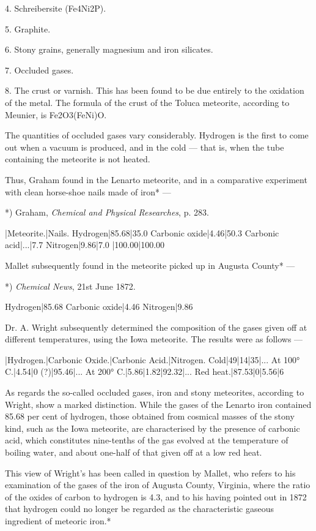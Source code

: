 \documentclass[a4paper, 12pt, oneside, polutonikogreek, english]{article}
\begin{document}
4. Schreibersite (Fe4Ni2P).

5. Graphite.

6. Stony grains, generally magnesium and iron silicates.

7. Occluded gases.

8. The crust or varnish. This has been found to be due entirely to the oxidation of the metal. The formula of the crust of the Toluca meteorite, according to Meunier, is Fe2O3(FeNi)O.

The quantities of occluded gases vary considerably. Hydrogen is the first to come out when a vacuum is produced, and in the cold --- that is, when the tube containing the meteorite is not heated.

Thus, Graham found in the Lenarto meteorite, and in a comparative experiment with clean horse-shoe nails made of iron* ---

*) Graham, \emph{Chemical and Physical Researches}, p. 283.

|Meteorite.|Nails. 
Hydrogen|85.68|35.0 
Carbonic oxide|4.46|50.3 
Carbonic acid|...|7.7 
Nitrogen|9.86|7.0 
|100.00|100.00

Mallet subsequently found in the meteorite picked up in Augusta County* ---

*) \emph{Chemical News}, 21st June 1872.

Hydrogen|85.68 
Carbonic oxide|4.46 
Nitrogen|9.86

Dr. A. Wright subsequently determined the composition of the gases given off at different temperatures, using the Iowa meteorite. The results were as follows ---

|Hydrogen.|Carbonic Oxide.|Carbonic Acid.|Nitrogen. 
Cold|49|14|35|... 
At 100° C.|4.54|0 (?)|95.46|... 
At 200° C.|5.86|1.82|92.32|... 
Red heat.|87.53|0|5.56|6

As regards the so-called occluded gases, iron and stony meteorites, according to Wright, show a marked distinction. While the gases of the Lenarto iron contained 85.68 per cent of hydrogen, those obtained from cosmical masses of the stony kind, such as the Iowa meteorite, are characterised by the presence of carbonic acid, which constitutes nine-tenths of the gas evolved at the temperature of boiling water, and about one-half of that given off at a low red heat.

This view of Wright's has been called in question by Mallet, who refers to his examination of the gases of the iron of Augusta County, Virginia, where the ratio of the oxides of carbon to hydrogen is 4.3, and to his having pointed out in 1872 that hydrogen could no longer be regarded as the characteristic gaseous ingredient of meteoric iron.*
\end{document}
